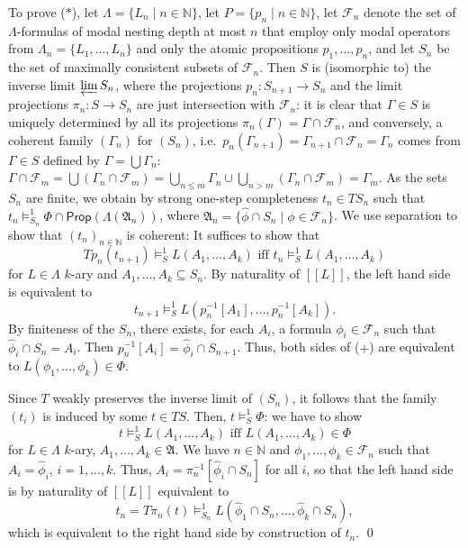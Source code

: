 \documentclass[proceedings]{stacs}
\theoremstyle{definition}
\theoremstyle{plain}
\newcommand{\Sem}[1]{{[\![#1]\!]}}
\newcommand{\FLang}{\mathcal{F}}
\newcommand{\Nat}{{\mathbb{N}}}
\newcommand{\Prop}{\mathsf{Prop}}
\newcommand{\invlim}{\varprojlim}
\newcommand{\modelsOS}{\models^1}
\newcommand{\FA}{\mathfrak{A}}
\newcommand{\AtProp}{P}
\begin{document}
  To prove ($*$), let $\Lambda=\{L_n\mid n\in\Nat\}$, let
  $\AtProp=\{p_n\mid n\in\Nat\}$, let $\FLang_n$ denote the set of
  $\Lambda$-formulas of modal nesting depth at most $n$ that employ
  only modal operators from $\Lambda_n=\{L_1,\dots,L_n\}$ and only the
  atomic propositions $p_1,\dots,p_n$, and let $S_n$ be the set of
  maximally consistent subsets of $\FLang_n$. Then $S$ is (isomorphic
  to) the inverse limit $\invlim S_n$, where the projections
  $p_n:S_{n+1}\to S_n$ and the limit projections $\pi_n:S\to S_n$ are
  just intersection with $\FLang_n$: it is clear that $\Gamma\in S$ is
  uniquely determined by all its projections $\pi_n(\Gamma)=\Gamma\cap
  \FLang_n$, and conversely, a coherent family $(\Gamma_n)$ for
  $(S_n)$, i.e.\ $p_n(\Gamma_{n+1})=\Gamma_{n+1}\cap\FLang_n=\Gamma_n$
  comes from $\Gamma\in S$ defined by $\Gamma=\bigcup\Gamma_n$:
  $\Gamma\cap\FLang_m=\bigcup (\Gamma_n\cap\FLang_m) =\bigcup_{n\le
    m}\Gamma_n\cup\bigcup_{n> m}(\Gamma_n\cap\FLang_m)=\Gamma_m$. As
  the sets $S_n$ are finite, we obtain by strong one-step completeness
  $t_n\in TS_n$ such that $t_n\modelsOS_{S_n}
  \Phi\cap\Prop(\Lambda(\FA_n))$, where $\FA_n=\{\hat\phi\cap
  S_n\mid\phi\in\FLang_n\}$. We use separation to show that
  $(t_n)_{n\in\Nat}$ is coherent: It suffices to show that
  \begin{equation*}\tag{$+$}
    Tp_n(t_{n+1})\models^1_SL(A_1,\dots,A_k)\textrm{ iff } t_n\models^1_S
    L(A_1,\dots,A_k)
  \end{equation*}
  for $L\in\Lambda$ $k$-ary and $A_1,\dots,A_k\subseteq S_n$.  By
  naturality of $\Sem{L}$, the left hand side is equivalent to
  \begin{equation*}
    t_{n+1}\models^1_SL(p_n^{-1}[A_1],\dots,p_n^{-1}[A_k]).
  \end{equation*}
  By finiteness of the $S_n$, there exists, for each $A_i$, a formula
  $\phi_i\in\FLang_n$ such that $\hat\phi_i\cap S_n=A_i$. Then
  $p_n^{-1}[A_i]=\hat\phi_i\cap S_{n+1}$. Thus, both sides of ($+$)
  are equivalent to $L(\phi_1,\dots,\phi_k)\in\Phi$.

  Since $T$ weakly preserves the inverse limit of $(S_n)$, it follows
  that the family $(t_i)$ is induced by some $t\in TS$. Then,
  $t\modelsOS_S\Phi$: we have to show
  \begin{equation*}
    t\models^1_SL(A_1,\dots,A_k)\textrm{ iff } L(A_1,\dots,A_k)\in\Phi
  \end{equation*}
  for $L\in\Lambda$ $k$-ary, $A_1,\dots,A_k\in\FA$. We have $n\in\Nat$
  and $\phi_1,\dots,\phi_k\in\FLang_n$ such that $A_i=\hat\phi_i$,
  $i=1,\dots,k$. Thus, $A_i=\pi_n^{-1}[\hat\phi_i\cap S_n]$ for all
  $i$, so that the left hand side is by naturality of $\Sem{L}$
  equivalent to
  \begin{equation*}
    t_n=T\pi_n(t)\models^1_{S_n}L(\hat\phi_1\cap S_n,\dots,\hat\phi_k\cap S_n),
  \end{equation*}
  which is equivalent to the right hand side by construction of 
  $t_n$.  \qed
\fi
\end{document}
